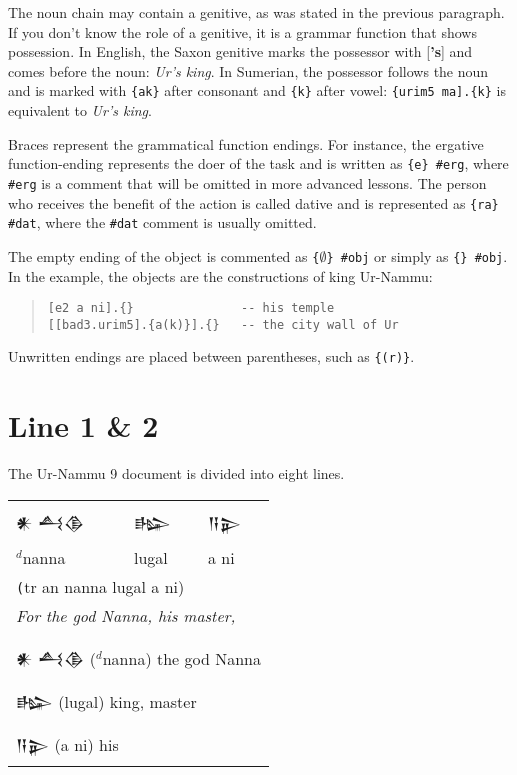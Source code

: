 \documentclass[a4paper,12pt]{book}
\newcommand{\fcn}{\setmainfont{Akkadian.otf}}
\begin{document}
The noun chain may contain a genitive, as was
stated in the previous paragraph. If you don't
know the role of a genitive, it is a grammar
function that shows possession. In English,
the Saxon genitive marks the possessor with
[{\bf 's}] and comes before the noun:
{\em Ur's king}. In Sumerian, the possessor
follows the noun and is marked with \verb|{ak}|
after consonant and \verb|{k}| after vowel:
\verb|{urim5 ma].{k}| is equivalent
to {\em Ur's king}.

Braces represent the grammatical function endings.
For instance, the ergative function-ending
represents the doer of the task and is written
as \verb|{e} #erg|, where \verb|#erg| is a comment
that will be omitted in more advanced lessons.
The person who receives the benefit of the
action is called dative and is represented
as \verb|{ra} #dat|, where the \verb|#dat|
comment is usually omitted.

The empty ending of the object is commented
as \verb|{|$\emptyset$\verb|} #obj| or simply as \verb|{} #obj|.
In the example, the objects are the constructions
of king Ur-Nammu:
\begin{quote}
\begin{verbatim}
[e2 a ni].{}               -- his temple
[[bad3.urim5].{a(k)}].{}   -- the city wall of Ur
\end{verbatim}
\end{quote}
Unwritten endings are placed between parentheses,
such as \verb|{(r)}|.

\section{Line 1 \& 2}
The Ur-Nammu 9 document is divided into eight lines.\\

\begin{tabular}[!h]{l l l}
\fcn\Large 𒀭 𒋀𒆠
&\fcn\Large 𒈗 &\fcn\Large 𒀀𒉌\\
  $^d$nanna & lugal & a ni\\
\multicolumn{3}{l}{\texttt (tr an nanna lugal a ni)}\\
\multicolumn{3}{l}{\em For the god Nanna, his master,}\\
\hline\\
\multicolumn{3}{l}{{\fcn 𒀭 𒋀𒆠}
                    ($^d$nanna) the god Nanna }\\
\multicolumn{3}{l}{{\fcn 𒈗}
                    (lugal) king, master }\\
\multicolumn{3}{l}{{\fcn 𒀀𒉌}
                    (a ni) his }\\
\end{tabular}
\end{document}
